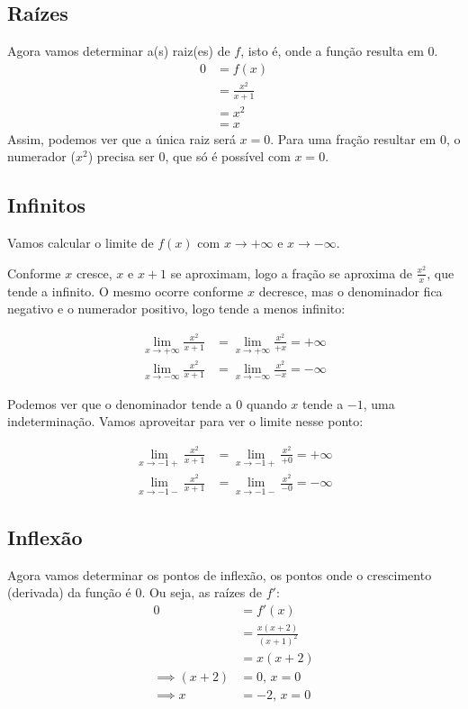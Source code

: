 \documentclass[12pt]{article}
\theoremstyle{definition}
\begin{document}
\subsection{Raízes}
Agora vamos determinar a(s) raiz(es) de \(f\), isto é, onde a função resulta em 0.
\begin{align*}
    0
    &= f(x) \\
    &= \frac{x^2}{x+1} \\
    &= x^2 \\
    &= x
\end{align*}
Assim, podemos ver que a única raiz será \(x=0\). Para uma fração resultar em 0, o numerador (\(x^2\)) precisa ser 0, que só é possível com \(x=0\).
\subsection{Infinitos}
Vamos calcular o limite de \(f(x)\) com \(x\rightarrow +\infty\) e \(x\rightarrow -\infty\).

Conforme \(x\) cresce, \(x\) e \(x+1\) se aproximam, logo a fração se aproxima de \(\frac{x^2}{x}\), que tende a infinito. O mesmo ocorre conforme \(x\) decresce, mas o denominador fica negativo e o numerador positivo, logo tende a menos infinito:

\begin{align*}
    \lim_{x\rightarrow +\infty} \frac{x^2}{x+1} &= \lim_{x\rightarrow +\infty} \frac{x^2}{+x} = +\infty \\
    \lim_{x\rightarrow -\infty} \frac{x^2}{x+1} &= \lim_{x\rightarrow -\infty} \frac{x^2}{-x} =  -\infty
\end{align*}

Podemos ver que o denominador tende a \(0\) quando \(x\) tende a \(-1\), uma indeterminação. Vamos aproveitar para ver o limite nesse ponto:

\begin{align*}
    \lim_{x\rightarrow -1+} \frac{x^2}{x+1} &= \lim_{x\rightarrow -1+} \frac{x^2}{+0} = +\infty \\
    \lim_{x\rightarrow -1-} \frac{x^2}{x+1} &= \lim_{x\rightarrow -1-} \frac{x^2}{-0} =  -\infty
\end{align*}
\subsection{Inflexão}
Agora vamos determinar os pontos de inflexão, os pontos onde o crescimento (derivada) da função é 0. Ou seja, as raízes de \(f'\):
\begin{align*}
    0
    &= f'(x) \\
    &= \frac{x(x+2)}{{(x+1)}^2} \\
    &= x(x+2) \\
    \implies (x+2) &= 0\text{, }x = 0 \\
    \implies x &= -2\text{, }x = 0
\end{align*}
\end{document}
